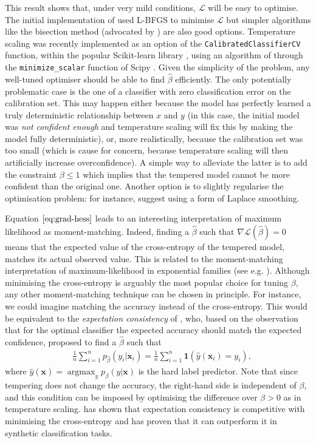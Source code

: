 \documentclass[10pt,dvipsnames]{article}
\newcommand{\bx}{\mathbf{x}}%
\DeclareMathOperator*{\argmax}{argmax}
\theoremstyle{plain}
\theoremstyle{definition}
\theoremstyle{remark}
\begin{document}
This result shows that, under very mild conditions, $\mathcal{L}$ will be easy to optimise. The initial implementation of \citet{guo2017calibration} used L-BFGS \citep{liu1989limited} to minimise $\mathcal{L}$ but simpler algorithms like the bisection method (advocated by \citealp{berta2025rethinking}) are also good options. Temperature scaling was recently implemented as an option of the \texttt{CalibratedClassifierCV} function, within the popular Scikit-learn library \citep{scikit-learn}, using an algorithm of \citet{brent1973algorithms} through the \texttt{minimize\_scalar} function of Scipy \citep{scipy}. Given the simplicity of the problem, any well-tuned optimiser should be able to find $\hat{\beta}$ efficiently. The only potentially problematic case is the one of a classifier with zero classification error on the calibration set. This may happen either because the model has perfectly learned a truly deterministic relationship between $x$ and $y$ (in this case, the initial model was \emph{not confident enough} and temperature scaling will fix this by making the model fully deterministic), or, more realistically, because the calibration set was too small (which is cause for concern, because temperature scaling will then artificially increase overconfidence). A simple way to alleviate the latter is to add the constraint $\beta \leq 1 $ which implies that the tempered model cannot be more confident than the original one. Another option is to slightly regularise the optimisation problem: for instance, \citet{berta2025rethinking} suggest using a form of Laplace smoothing. 

Equation $\eqref{eq:grad-hess}$ leads to an interesting interpretation of maximum likelihood as moment-matching. Indeed, finding a $\hat{\beta}$ such that $\nabla \mathcal{L}(\hat{\beta}) = 0$ means that the expected value of the cross-entropy of the tempered model, matches its actual observed value. This is related to the moment-matching interpretation of maximum-likelihood in exponential families (see e.g. \citealp{domke2020moment}). Although minimising the cross-entropy is arguably the most popular choice for tuning $\beta$, any other moment-matching technique can be chosen in principle. For instance, we could imagine matching the accuracy instead of the cross-entropy. This would be equivalent to the \emph{expectation consistency} of \citet{clarte2023expectation}, who, based on the observation that for the optimal classifier the expected accuracy should match the expected confidence, proposed to find a $\hat{\beta}$ such that
\begin{align}
\label{eq:EC}
    \quad\frac{1}{n}\sum\limits_{i=1}^{n}p_{\hat{\beta}}(y_{i}|\bx_{i}) = \frac{1}{n}\sum\limits_{i=1}^{n}\boldsymbol{1}(\hat{y}(\bx_{i})=y_{i}),
\end{align}
where $\hat{y}(\bx)=\argmax_{y} p_{\beta}(y|\bx)$ is the hard label predictor. Note that since tempering does not change the accuracy, the right-hand side is independent of $\beta$, and this condition can be imposed by optimising the difference over $\beta>0$ as in temperature scaling. \citet{clarte2023expectation} has shown that expectation consistency is competitive with minimising the cross-entropy and has proven that it can outperform it in synthetic classification tasks.
\end{document}
